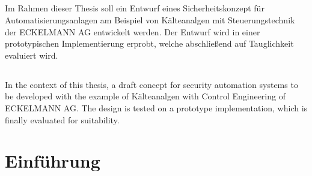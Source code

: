 \documentclass[11pt,a4paper]{report}
\begin{document}

\vfill
\section*{\center\abstractname{}}

Im Rahmen dieser Thesis soll ein Entwurf eines Sicherheitskonzept für Automatisierungsanlagen am Beispiel von Kälteanalgen mit Steuerungstechnik der ECKELMANN AG entwickelt werden. Der Entwurf wird in einer prototypischen Implementierung erprobt, welche abschließend auf Tauglichkeit evaluiert wird.

\vfill

\begin{otherlanguage}{english} 
\section*{\center\abstractname{}}

In the context of this thesis, a draft concept for security automation systems to be developed with the example of Kälteanalgen with Control Engineering of ECKELMANN AG. The design is tested on a prototype implementation, which is finally evaluated for suitability.

\end{otherlanguage}
\vfill

\tableofcontents
\clearpage 


\chapter{Einführung} \label{chap:intro}
\end{document}
